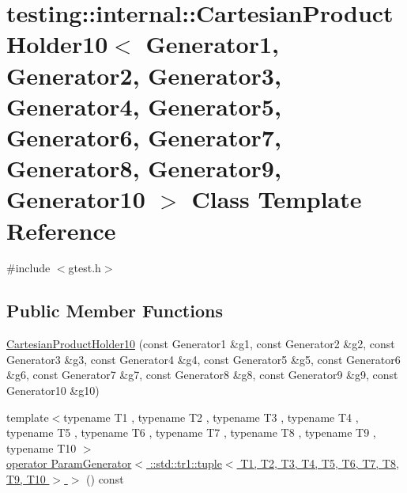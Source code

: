 \hypertarget{classtesting_1_1internal_1_1_cartesian_product_holder10}{\section{testing\-:\-:internal\-:\-:Cartesian\-Product\-Holder10$<$ Generator1, Generator2, Generator3, Generator4, Generator5, Generator6, Generator7, Generator8, Generator9, Generator10 $>$ Class Template Reference}
\label{classtesting_1_1internal_1_1_cartesian_product_holder10}
}


{\ttfamily \#include $<$gtest.\-h$>$}

\subsection*{Public Member Functions}
\begin{DoxyCompactItemize}
\item 
\hyperlink{classtesting_1_1internal_1_1_cartesian_product_holder10_a3255f824dd20e02b8bb718bb7d3d3634}{Cartesian\-Product\-Holder10} (const Generator1 \&g1, const Generator2 \&g2, const Generator3 \&g3, const Generator4 \&g4, const Generator5 \&g5, const Generator6 \&g6, const Generator7 \&g7, const Generator8 \&g8, const Generator9 \&g9, const Generator10 \&g10)
\item 
{\footnotesize template$<$typename T1 , typename T2 , typename T3 , typename T4 , typename T5 , typename T6 , typename T7 , typename T8 , typename T9 , typename T10 $>$ }\\\hyperlink{classtesting_1_1internal_1_1_cartesian_product_holder10_a12d69df36cfa423afb9726e712149447}{operator Param\-Generator$<$ \-::std\-::tr1\-::tuple$<$ T1, T2, T3, T4, T5, T6, T7, T8, T9, T10 $>$ $>$} () const 
\end{DoxyCompactItemize}


